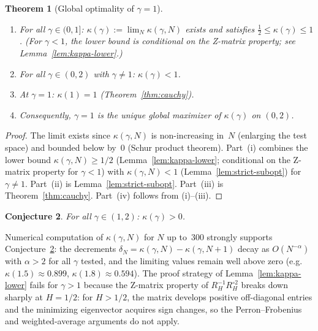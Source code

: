 \documentclass[11pt,a4paper]{article}
\theoremstyle{plain}
\newtheorem{theorem}{Theorem}[section]
\newtheorem{conjecture}[theorem]{Conjecture}
\theoremstyle{definition}
\theoremstyle{remark}
\begin{document}
\begin{theorem}[Global optimality of $\gamma = 1$]\label{thm:phase-transition}
\begin{enumerate}[label=(\roman*)]
\item For all $\gamma \in (0,1]$:
  $\kappa(\gamma) := \lim_N \kappa(\gamma,N)$
  exists and satisfies $\frac{1}{2} \leq \kappa(\gamma) \leq 1$.
  (For $\gamma < 1$, the lower bound is conditional on the
  Z-matrix property; see Lemma~\ref{lem:kappa-lower}.)
\item For all $\gamma \in (0,2)$ with $\gamma \neq 1$:
  $\kappa(\gamma) < 1$.
\item At $\gamma = 1$: $\kappa(1) = 1$
  (Theorem~\ref{thm:cauchy}).
\item Consequently, $\gamma = 1$ is the unique global maximizer
  of $\kappa(\gamma)$ on $(0,2)$.
\end{enumerate}
\end{theorem}

\begin{proof}
The limit exists since $\kappa(\gamma,N)$ is non-increasing
in~$N$ (enlarging the test space) and bounded below by~$0$
(Schur product theorem). Part~(i) combines the lower bound
$\kappa(\gamma,N) \geq 1/2$
(Lemma~\ref{lem:kappa-lower}; conditional on the Z-matrix
property for $\gamma < 1$) with
$\kappa(\gamma,N) < 1$ (Lemma~\ref{lem:strict-subopt}) for
$\gamma \neq 1$. Part~(ii) is Lemma~\ref{lem:strict-subopt}.
Part~(iii) is Theorem~\ref{thm:cauchy}. Part~(iv)
follows from (i)--(iii).
\end{proof}

\begin{conjecture}\label{conj:kappa-positive}
For all $\gamma \in (1,2)$: $\kappa(\gamma) > 0$.
\end{conjecture}

Numerical computation of $\kappa(\gamma,N)$ for $N$ up to~$300$
strongly supports Conjecture~\ref{conj:kappa-positive}: the
decrements $\delta_N = \kappa(\gamma,N) - \kappa(\gamma,N{+}1)$
decay as $O(N^{-\alpha})$ with $\alpha > 2$ for all $\gamma$
tested, and the limiting values remain well above zero
(e.g.\ $\kappa(1.5) \approx 0.899$, $\kappa(1.8) \approx 0.594$).
The proof strategy of Lemma~\ref{lem:kappa-lower} fails for
$\gamma > 1$ because the Z-matrix property of
$R_H^{-1} R_H^{\circ 2}$ breaks down sharply at $H = 1/2$:
for $H > 1/2$, the matrix develops positive off-diagonal entries
and the minimizing eigenvector acquires sign changes, so the
Perron--Frobenius and weighted-average arguments do not apply.
\end{document}
